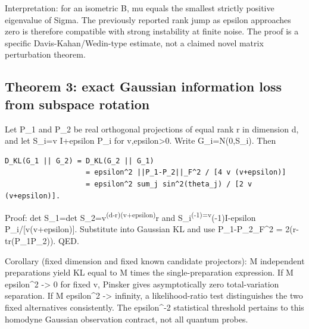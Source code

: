 \documentclass[
  10pt,
  a4paper,
]{article}
\begin{document}
Interpretation: for an isometric B, mu equals the smallest strictly positive eigenvalue of Sigma. The previously reported rank jump as epsilon approaches zero is therefore compatible with strong instability at finite noise. The proof is a specific Davis-Kahan/Wedin-type estimate, not a claimed novel matrix perturbation theorem.

\subsection{Theorem 3: exact Gaussian information loss from subspace rotation}\label{theorem-3-exact-gaussian-information-loss-from-subspace-rotation}

Let P\_1 and P\_2 be real orthogonal projections of equal rank r in dimension d, and let S\_i=v I+epsilon P\_i for v,epsilon\textgreater0. Write G\_i=N(0,S\_i). Then

\begin{verbatim}
D_KL(G_1 || G_2) = D_KL(G_2 || G_1)
                   = epsilon^2 ||P_1-P_2||_F^2 / [4 v (v+epsilon)]
                   = epsilon^2 sum_j sin^2(theta_j) / [2 v (v+epsilon)].
\end{verbatim}

Proof: det S\_1=det S\_2=v\textsuperscript{(d-r)(v+epsilon)}r and S\_i\textsuperscript{(-1)=v}(-1)I-epsilon P\_i/{[}v(v+epsilon){]}. Substitute into Gaussian KL and use \textbar\textbar P\_1-P\_2\textbar\textbar\_F\^{}2 = 2(r-tr(P\_1P\_2)). QED.

Corollary (fixed dimension and fixed known candidate projectors): M independent preparations yield KL equal to M times the single-preparation expression. If M epsilon\^{}2 -\textgreater{} 0 for fixed v, Pinsker gives asymptotically zero total-variation separation. If M epsilon\^{}2 -\textgreater{} infinity, a likelihood-ratio test distinguishes the two fixed alternatives consistently. The epsilon\^{}-2 statistical threshold pertains to this homodyne Gaussian observation contract, not all quantum probes.
\end{document}
